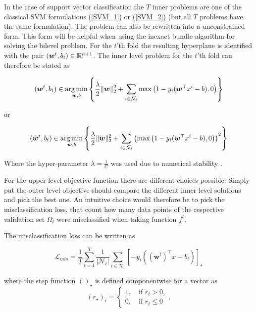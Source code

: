 In the case of support vector classification the \(T\) inner problems are one of the classical SVM formulations (\ref{SVM_1}) or (\ref{SVM_2}) (but all \(T\) problems have the same formulation).
The problem can also be rewritten into a unconstrained form. This form will be helpful when using the inexact bundle algorithm for solving the bilevel problem.
For the \(t\)'th fold the resulting hyperplane is identified with the pair \((\bm{w}^t,b_t) \in \mathbb{R}^{n+1}\).
The inner level problem for the \(t\)'th fold can therefore be stated as

\begin{equation}
	(\bm{w}^t,b_t) \in \operatorname*{arg\,min}_{\bm{w},b}\left\{ \frac{\lambda}{2} \|\bm{w}\|^2_2+\sum_{i\in \bar{\mathcal{N}}_t}{\max\left(1-y_i(\bm{w}^{\top}x^i-b),0\right)}\right\}
\label{lower_t_1}
\end{equation}

or

\begin{equation}
	(\bm{w}^t,b_t) \in \operatorname*{arg\,min}_{\bm{w},b} \left\{\frac{\lambda}{2} \|\bm{w}\|^2_2+\sum_{i\in \bar{\mathcal{N}}_t}{\left(\max\left(1-y_i(\bm{w}^{\top}x^i-b),0\right)\right)^2}\right\}
\label{lower_t_2}
\end{equation}

Where the hyper-parameter \(\lambda = \frac{1}{C}\) was used  due to numerical stability \cite{Kunapuli2008}.

For the upper level objective function there are different choices possible.
Simply put the outer level objective should compare the different inner level solutions and pick the best one. An intuitive choice would therefore be to pick the misclassification loss, that count how many data points of the respective validation set \(\Omega_t\) were misclassified when taking function \(f^t\).

The misclassification loss can be written as

\begin{equation}
	\mathcal{L}_{mis} = \frac{1}{T}\sum_{t=1}^T\frac{1}{|\mathcal{N}_t|}\sum_{i \in \mathcal{N}_t}{\left[-y_i((\bm{w}^t)^{\top}x-b_t)\right]_{\star}}
\label{misclass_loss}
\end{equation}

where the step function \(()_{\star}\) is defined componentwise for a vector as
\begin{equation}
	(r_{\star})_i = \left\{\begin{array}{c} 1, \quad \text{if } r_i > 0, \\ 0, \quad \text{if } r_i \leq 0 \end{array} \right. .
\label{step_fun}
\end{equation}

